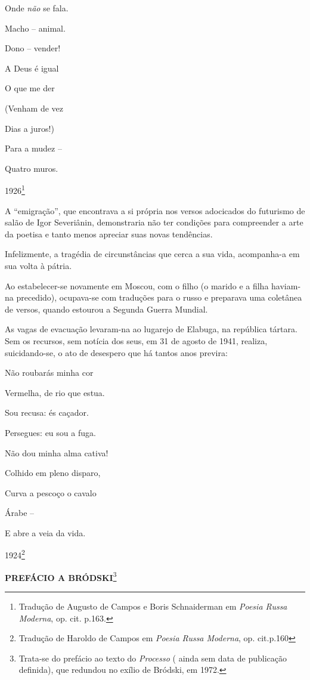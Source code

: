 Onde \emph{não} se fala.

Macho -- animal.

Dono -- vender!

A Deus é igual

O que me der

(Venham de vez

Dias a juros!)

Para a mudez --

Quatro muros.

1926\footnote{Tradução de Augusto de Campos e Boris Schnaiderman em
  \emph{Poesia Russa Moderna}, op. cit. p.163.}

A ``emigração'', que encontrava a si própria nos versos adocicados do
futurismo de salão de Igor Severiânin, demonstraria não ter condições
para compreender a arte da poetisa e tanto menos apreciar suas novas
tendências.

Infelizmente, a tragédia de circunstâncias que cerca a sua vida,
acompanha-a em sua volta à pátria.

Ao estabelecer-se novamente em Moscou, com o filho (o marido e a filha
haviam-na precedido), ocupava-se com traduções para o russo e preparava
uma coletânea de versos, quando estourou a Segunda Guerra Mundial.

As vagas de evacuação levaram-na ao lugarejo de Elabuga, na república
tártara. Sem os recursos, sem notícia dos seus, em 31 de agosto de 1941,
realiza, suicidando-se, o ato de desespero que há tantos anos previra:

Não roubarás minha cor

Vermelha, de rio que estua.

Sou recusa: és caçador.

Persegues: eu sou a fuga.

Não dou minha alma cativa!

Colhido em pleno disparo,

Curva a pescoço o cavalo

Árabe --

E abre a veia da vida.

1924\footnote{Tradução de Haroldo de Campos em \emph{Poesia Russa
  Moderna}, op. cit.p.160}

\textbf{PREFÁCIO A BRÓDSKI}\footnote{Trata-se do prefácio ao texto do
  \emph{Processo} ( ainda sem data de publicação definida), que redundou
  no exílio de Bródski, em 1972.}

